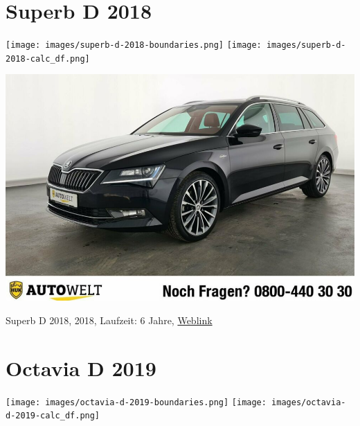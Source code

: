 \documentclass[landscape, DIV=99, 14pt]{scrartcl}
\begin{document}
\pagebreak


\twocolumn

\section*{Superb D 2018}
\begin{center}
\texttt{[image: images/superb-d-2018-boundaries.png]}
\null
\vspace{0.5cm}
\texttt{[image: images/superb-d-2018-calc\_df.png]}
\end{center}

\pagebreak
\null
\vspace{2cm}
\begin{center}
\includegraphics[width=0.9\columnwidth]{cars/skoda-superb.png}

Superb D 2018, 2018, Laufzeit: 6 Jahre, \href{https://suchen.mobile.de/fahrzeuge/details.html?id=336967099}{Weblink}
\end{center}

\pagebreak


\twocolumn

\section*{Octavia D 2019}
\begin{center}
\texttt{[image: images/octavia-d-2019-boundaries.png]}
\null
\vspace{0.5cm}
\texttt{[image: images/octavia-d-2019-calc\_df.png]}
\end{center}
\end{document}
